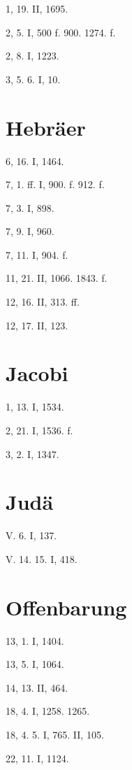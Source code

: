 1, 19. II, 1695.

2, 5. I, 500 f. 900. 1274. f.

2, 8. I, 1223.

3, 5. 6. I, 10.

\section{Hebräer}

6, 16. I, 1464.

7, 1. ff. I, 900. f. 912. f.

7, 3. I, 898.

7, 9. I, 960.

7, 11. I, 904. f.

11, 21. II, 1066. 1843. f.

12, 16. II, 313. ff.

12, 17. II, 123.

\section{Jacobi}

1, 13. I, 1534.

2, 21. I, 1536. f.

3, 2. I, 1347.

\section{Judä}

V. 6. I, 137.

V. 14. 15. I, 418.

\section{Offenbarung}

13, 1. I, 1404.

13, 5. I, 1064.

14, 13. II, 464.

18, 4. I, 1258. 1265.

18, 4. 5. I, 765. II, 105.

22, 11. I, 1124.
